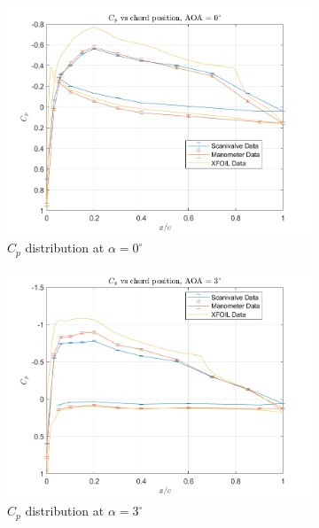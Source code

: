 \documentclass[runningheads]{llncs}
\begin{document}
\newpage
\begin{figure}[H]\label{fig:cp}
    \centering
    \begin{subfigure}[b]{0.3\textwidth}
        \centering
        \includegraphics[width=\textwidth]{figures/AOA0.png}
        \caption{$C_p$ distribution at $\alpha = 0^\circ$}
        \label{fig:cp_0}
    \end{subfigure}
    \begin{subfigure}[b]{0.3\textwidth}
        \centering
        \includegraphics[width=\textwidth]{figures/AOA3.png}
        \caption{$C_p$ distribution at $\alpha = 3^\circ$}
        \label{fig:cp_3}
    \end{subfigure}
    \begin{subfigure}[b]{0.3\textwidth}

\end{subfigure}
\end{figure}
\end{document}
